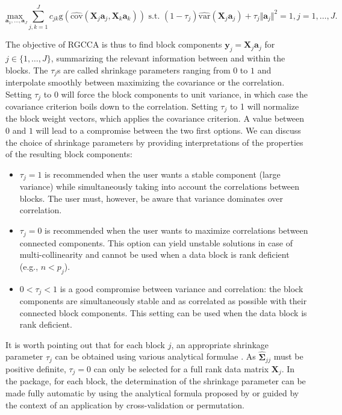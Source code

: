 \documentclass[
]{jss}
\begin{document}
\begin{equation}
\underset{\mathbf{a}_1, \ldots,\mathbf{a}_J}{\text{max }} \displaystyle \sum_{j, k = 1}^J c_{jk} \text{g}\left(\widehat{\text{cov}}\left(\mathbf{X}_j\mathbf{a}_j, \mathbf{X}_k\mathbf{a}_k\right)\right) 
\text{ s.t. } (1-\tau_j)\widehat{\text{var}}(\mathbf{X}_j\mathbf{a}_j) + \tau_j \Vert \mathbf{a}_j \Vert^2 = 1, j =1, \ldots, J. 
\label{optim_RGCCA_sample2}
\end{equation}

The objective of RGCCA is thus to find block components
\(\mathbf y_j = \mathbf X_j \mathbf a_j\) for
\(j \in \{1, \ldots, J\}\), summarizing the relevant information between
and within the blocks. The \(\tau_j\)s are called shrinkage parameters
ranging from \(0\) to \(1\) and interpolate smoothly between maximizing
the covariance or the correlation. Setting \(\tau_j\) to 0 will force
the block components to unit variance, in which case the covariance
criterion boils down to the correlation. Setting \(\tau_j\) to 1 will
normalize the block weight vectors, which applies the covariance
criterion. A value between \(0\) and \(1\) will lead to a compromise
between the two first options. We can discuss the choice of shrinkage
parameters by providing interpretations of the properties of the
resulting block components:

\begin{itemize}
\item   $\tau_j=1$ is recommended when the user wants a stable component (large variance) while simultaneously taking into account the correlations between blocks. The user must, however, be aware that variance dominates over correlation.

\item   $\tau_j=0$ is recommended when the user wants to maximize correlations between connected components. This option can yield unstable solutions in case of multi-collinearity and cannot be used when a data block is rank deficient (e.g., $n<p_j$).

\item   $0<\tau_j<1$ is a good compromise between variance and correlation: the block components are simultaneously stable and as correlated as possible with their connected block components. This setting can be used when the data block is rank deficient.
\end{itemize}

It is worth pointing out that for each block \(j\), an appropriate
shrinkage parameter \(\tau_j\) can be obtained using various analytical
formulae \citep[see][for instance]{Ledoit2004, Schafer2005, Chen2011}.
As \(\widehat{\mathbf{\Sigma}}_{jj}\) must be positive definite,
\(\tau_j = 0\) can only be selected for a full rank data matrix
\(\mathbf{X}_j\). In the  package, for each block, the
determination of the shrinkage parameter can be made fully automatic by
using the analytical formula proposed by \cite{Schafer2005} or guided by
the context of an application by cross-validation or permutation.
\end{document}
